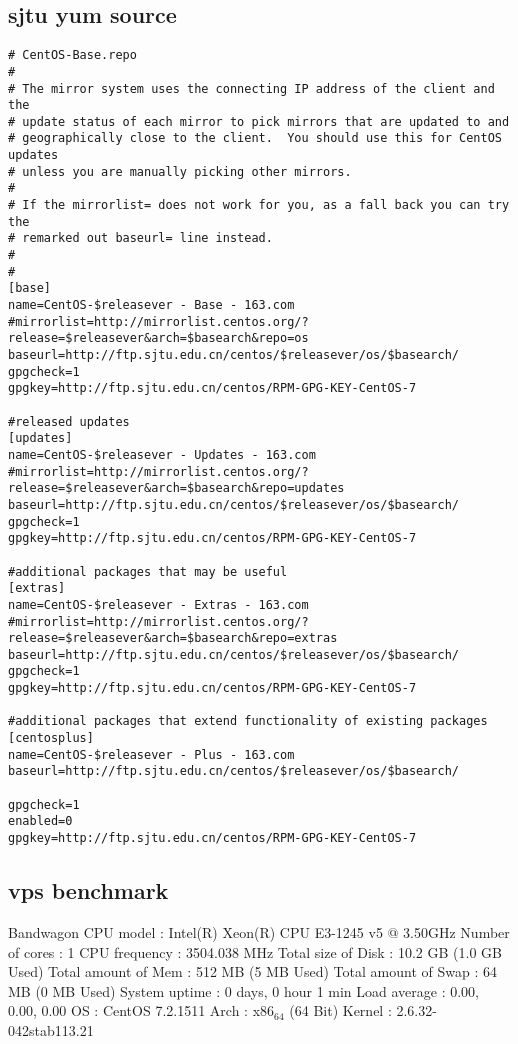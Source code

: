 \documentclass[11pt]{article}
\begin{document}
\subsection{sjtu yum source}
\label{sec:org170f07f}
\begin{verbatim}
# CentOS-Base.repo
#
# The mirror system uses the connecting IP address of the client and the
# update status of each mirror to pick mirrors that are updated to and
# geographically close to the client.  You should use this for CentOS updates
# unless you are manually picking other mirrors.
#
# If the mirrorlist= does not work for you, as a fall back you can try the 
# remarked out baseurl= line instead.
#
#
[base]
name=CentOS-$releasever - Base - 163.com
#mirrorlist=http://mirrorlist.centos.org/?release=$releasever&arch=$basearch&repo=os
baseurl=http://ftp.sjtu.edu.cn/centos/$releasever/os/$basearch/
gpgcheck=1
gpgkey=http://ftp.sjtu.edu.cn/centos/RPM-GPG-KEY-CentOS-7

#released updates
[updates]
name=CentOS-$releasever - Updates - 163.com
#mirrorlist=http://mirrorlist.centos.org/?release=$releasever&arch=$basearch&repo=updates
baseurl=http://ftp.sjtu.edu.cn/centos/$releasever/os/$basearch/
gpgcheck=1
gpgkey=http://ftp.sjtu.edu.cn/centos/RPM-GPG-KEY-CentOS-7

#additional packages that may be useful
[extras]
name=CentOS-$releasever - Extras - 163.com
#mirrorlist=http://mirrorlist.centos.org/?release=$releasever&arch=$basearch&repo=extras
baseurl=http://ftp.sjtu.edu.cn/centos/$releasever/os/$basearch/
gpgcheck=1
gpgkey=http://ftp.sjtu.edu.cn/centos/RPM-GPG-KEY-CentOS-7

#additional packages that extend functionality of existing packages
[centosplus]
name=CentOS-$releasever - Plus - 163.com
baseurl=http://ftp.sjtu.edu.cn/centos/$releasever/os/$basearch/

gpgcheck=1
enabled=0
gpgkey=http://ftp.sjtu.edu.cn/centos/RPM-GPG-KEY-CentOS-7
\end{verbatim}
\subsection{vps benchmark}
\label{sec:org082b9a0}
Bandwagon
CPU model            : Intel(R) Xeon(R) CPU E3-1245 v5 @ 3.50GHz
Number of cores      : 1
CPU frequency        : 3504.038 MHz
Total size of Disk   : 10.2 GB (1.0 GB Used)
Total amount of Mem  : 512 MB (5 MB Used)
Total amount of Swap : 64 MB (0 MB Used)
System uptime        : 0 days, 0 hour 1 min
Load average         : 0.00, 0.00, 0.00
OS                   : CentOS 7.2.1511
Arch                 : x86\(_{\text{64}}\) (64 Bit)
Kernel               : 2.6.32-042stab113.21
\end{document}
